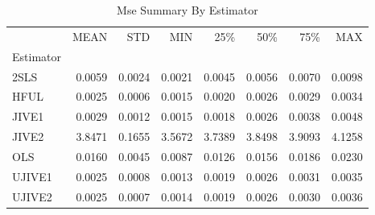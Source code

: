 \begin{table}[ht]
\centering
\caption{Mse Summary By Estimator}
\begin{tabular}{lrrrrrrr}
\toprule
 & MEAN & STD & MIN & 25\% & 50\% & 75\% & MAX \\
Estimator &  &  &  &  &  &  &  \\
\midrule
2SLS & 0.0059 & 0.0024 & 0.0021 & 0.0045 & 0.0056 & 0.0070 & 0.0098 \\
HFUL & 0.0025 & 0.0006 & 0.0015 & 0.0020 & 0.0026 & 0.0029 & 0.0034 \\
JIVE1 & 0.0029 & 0.0012 & 0.0015 & 0.0018 & 0.0026 & 0.0038 & 0.0048 \\
JIVE2 & 3.8471 & 0.1655 & 3.5672 & 3.7389 & 3.8498 & 3.9093 & 4.1258 \\
OLS & 0.0160 & 0.0045 & 0.0087 & 0.0126 & 0.0156 & 0.0186 & 0.0230 \\
UJIVE1 & 0.0025 & 0.0008 & 0.0013 & 0.0019 & 0.0026 & 0.0031 & 0.0035 \\
UJIVE2 & 0.0025 & 0.0007 & 0.0014 & 0.0019 & 0.0026 & 0.0030 & 0.0036 \\
\bottomrule
\end{tabular}
\end{table}
